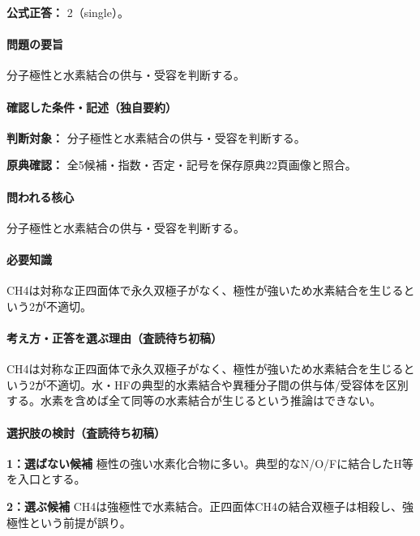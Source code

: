 \textbf{公式正答：} 2（single）。

\paragraph{問題の要旨} 分子極性と水素結合の供与・受容を判断する。

\paragraph{確認した条件・記述（独自要約）}\mbox{}\par

\noindent\textbf{判断対象：} 分子極性と水素結合の供与・受容を判断する。\par

\noindent\textbf{原典確認：} 全5候補・指数・否定・記号を保存原典22頁画像と照合。\par

\paragraph{問われる核心} 分子極性と水素結合の供与・受容を判断する。

\paragraph{必要知識} CH4は対称な正四面体で永久双極子がなく、極性が強いため水素結合を生じるという2が不適切。

\paragraph{考え方・正答を選ぶ理由（査読待ち初稿）} CH4は対称な正四面体で永久双極子がなく、極性が強いため水素結合を生じるという2が不適切。水・HFの典型的水素結合や異種分子間の供与体/受容体を区別する。水素を含めば全て同等の水素結合が生じるという推論はできない。

\paragraph{選択肢の検討（査読待ち初稿）}\mbox{}\par

\noindent\textbf{1：選ばない候補} 極性の強い水素化合物に多い。典型的なN/O/Fに結合したH等を入口とする。\par

\noindent\textbf{2：選ぶ候補} CH4は強極性で水素結合。正四面体CH4の結合双極子は相殺し、強極性という前提が誤り。\par

